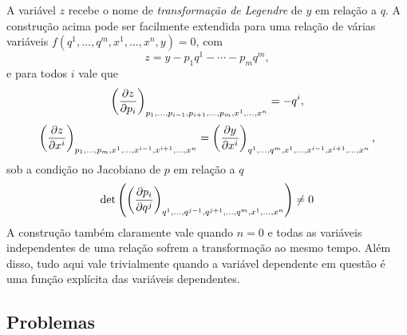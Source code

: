 \documentclass[a4paper, 12pt]{article}
\newcommand{\pd}[3]{\ifblank{#3}{}{\left(}\frac{\partial #1}{\partial #2}\ifblank{#3}{}{\right)_{#3}}}
\theoremstyle{definition}
\theoremstyle{definition}
\begin{document}
A variável $z$ recebe o nome de \textit{transformação de Legendre} de $y$ em relação a $q$. A 
construção acima pode ser facilmente extendida para uma relação de várias variáveis 
$f(q^1,\dots,q^m,x^1,\dots,x^n,y)=0$, com
$$z=y-p_1q^1-\cdots-p_mq^m,$$
e para todos $i$ vale que
$$\pd{z}{p_i}{p_1,\dots,p_{i-1},p_{i+1},\dots,p_m,x^1,\dots,x^n}=-q^i,$$
$$\pd{z}{x^i}{p_1,\dots,p_m,x^1,\dots,x^{i-1},x^{i+1},\dots,x^n}=
\pd{y}{x^i}{q^1,\dots,q^m,x^1,\dots,x^{i-1},x^{i+1},\dots,x^n},$$
sob a condição no Jacobiano de $p$ em relação a $q$
$$\det\left(\pd{p_i}{q^j}{q^1,\dots,q^{j-1},q^{j+1},\dots,q^m,x^1,\dots,x^n}\right)\neq0$$
A construção também claramente vale quando $n=0$ e todas as variáveis independentes de uma relação sofrem
a transformação ao mesmo tempo. Além disso, tudo aqui vale trivialmente quando a variável dependente
em questão é uma função explícita das variáveis dependentes.

\subsection{Problemas}
\end{document}
